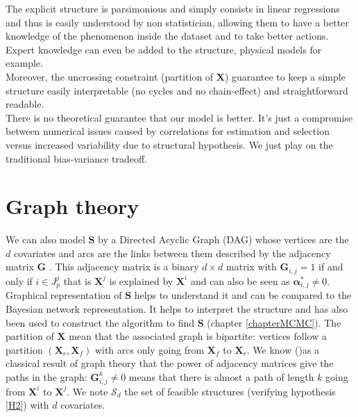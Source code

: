 \documentclass[12pt,a4paper]{report}
\begin{document}
The explicit structure is parsimonious and simply consists in linear regressions and thus is easily understood by non statistician, allowing them to have a better knowledge of the phenomenon inside the dataset and to take better actions. Expert knowledge can even be added to the structure, physical models for example.\\

Moreover, the uncrossing constraint (partition of $\boldsymbol{X}$) guarantee to keep a simple structure easily interpretable (no cycles and no chain-effect) and straightforward readable.\\
	
			There is no theoretical guarantee that our model is better. It's just a compromise between numerical issues caused by correlations for estimation and selection versus increased variability due to structural hypothesis. We just play on the traditional bias-variance tradeoff. 
			


\section{Graph theory}\label{sectiongraph}
	We can also model $\boldsymbol{S}$ by a Directed Acyclic Graph (DAG) whose vertices are the $d$ covariates and arcs are the links between them described by the adjacency matrix $\boldsymbol{G}$ \cite{bondy1976graph}. This adjacency matrix is a binary $d\times d$ matrix with $\boldsymbol{G}_{i,j}=1$ if and only if $i \in J_p^j$ that is $\boldsymbol{X}^j$ is explained by $\boldsymbol{X}^i$ and can also be seen as $\boldsymbol{\alpha}^*_{i,j}\neq 0$.\\
	
	Graphical representation of $\boldsymbol{S}$ helps to understand it and can be compared to the Bayesian network representation. It helps to interpret the structure and has also been used to construct the algorithm to find $\boldsymbol{S}$ (chapter \ref{chapterMCMC}).
	The partition of $\boldsymbol{X}$ mean that the associated graph is bipartite: vertices follow a partition $(\boldsymbol{X}_r,\boldsymbol{X}_f)$ with arcs only going from $\boldsymbol{X}_f$ to $\boldsymbol{X}_r$.
	We know (\cite{biggs1993algebraic})as a classical result of graph theory that the power of adjacency matrices give the paths in the graph: $\boldsymbol{G}^k_{i,j}\neq 0$ means that there is almost a path of length $k$ going from $\boldsymbol{X}^i$ to $\boldsymbol{X}^j$. We note $\mathcal{S}_d$ the set of feasible structures (verifying hypothesis \ref{H2}) with $d$ covariates.\\
	
\end{document}
